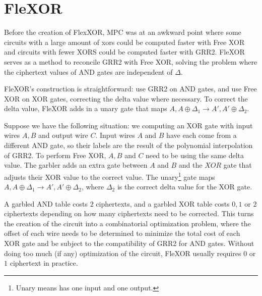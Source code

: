 
\section{FleXOR}
Before the creation of FlexXOR, MPC was at an awkward point where some circuits with a large amount of xors could be computed faster with Free XOR and circuits with fewer XORS could be computed faster with GRR2.
FleXOR serves as a method to reconcile GRR2 with Free XOR, solving the problem where the ciphertext values of AND gates are independent of $\Delta$.

FleXOR's construction is straightforward: use GRR2 on AND gates, and use Free XOR on XOR gates, correcting the delta value where necessary.
To correct the delta value, FleXOR adds in a unary gate that maps $A, A \oplus \Delta_1 \to A', A' \oplus \Delta_2$.

Suppose we have the following situation: we computing an XOR gate with input wires $A,B$ and output wire $C$.
Input wires $A$ and $B$ have each come from a different AND gate, so their labels are the result of the polynomial interpolation of GRR2.
To perform Free XOR, $A,B$ and $C$ need to be using the same delta value. 
The garbler adds an extra gate between $A$ and $B$ and the $XOR$ gate that adjusts their XOR value to the correct value.
The unary\footnote{Unary means has one input and one output.} gate maps $A,A \oplus \Delta_1 \to A', A' \oplus \Delta_2$, where $\Delta_2$ is the correct delta value for the XOR gate.

A garbled AND table costs $2$ ciphertexts, and a garbled XOR table costs $0,1$ or $2$ ciphertexts depending on how many ciphertexts need to be corrected.
This turns the creation of the circuit into a combinatorial optimization problem, where the offset of each wire needs to be determined to minimize the total cost of each XOR gate and be subject to the compatibility of GRR2 for AND gates.
Without doing too much (if any) optimization of the circuit, FleXOR usually requires $0$ or $1$ ciphertext in practice.

